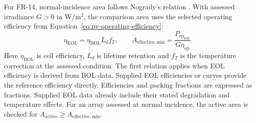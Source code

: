 For FR-14, normal-incidence area follows Nogrady's relation \citep[Sec.~4.3.4]{review-1009}. With assessed irradiance $G>0$ in W/m$^2$, the comparison area uses the selected operating efficiency from Equation~\eqref{eq:pv-operating-efficiency}:
\begin{equation}
    \eta_{\mathrm{EOL}}=\eta_{\mathrm{BOL}}L_d f_T,
    \qquad
    A_{\mathrm{effective,min}}=
    \frac{P_{\mathrm{sp}_{\min}}}{G\eta_{\mathrm{op}}}.
    \label{eq:array-effective-area}
\end{equation}
Here $\eta_{\mathrm{BOL}}$ is cell efficiency, $L_d$ is lifetime retention and $f_T$ is the temperature correction at the assessed condition. The first relation applies when EOL efficiency is derived from BOL data. Supplied EOL efficiencies or curves provide the reference efficiency directly. Efficiencies and packing fractions are expressed as fractions. Supplied EOL data already include their stated degradation and temperature effects. For an array assessed at normal incidence, the active area is checked for $A_{\mathrm{active}}\geq A_{\mathrm{effective,min}}$.

